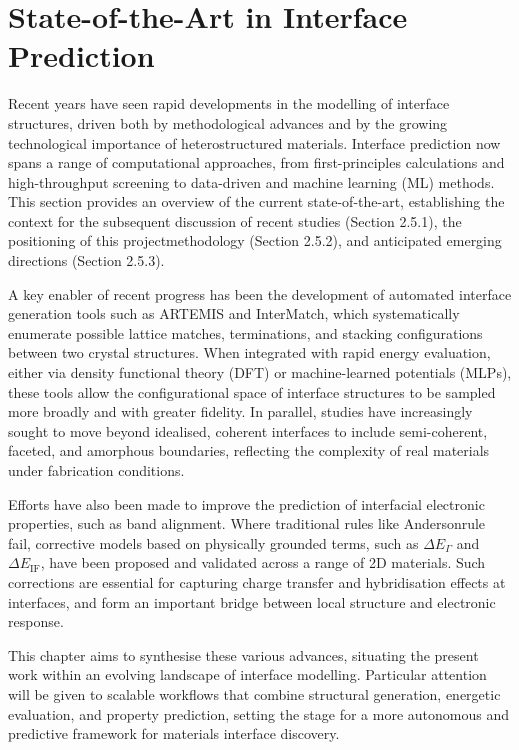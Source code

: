 \section{State-of-the-Art in Interface Prediction} \label{section:state_of_the_art}

Recent years have seen rapid developments in the modelling of interface structures, driven both by methodological advances and by the growing technological importance of heterostructured materials. Interface prediction now spans a range of computational approaches, from first-principles calculations and high-throughput screening to data-driven and machine learning (ML) methods. This section provides an overview of the current state-of-the-art, establishing the context for the subsequent discussion of recent studies (Section 2.5.1), the positioning of this project\rqss methodology (Section 2.5.2), and anticipated emerging directions (Section 2.5.3).

A key enabler of recent progress has been the development of automated interface generation tools such as ARTEMIS and InterMatch, which systematically enumerate possible lattice matches, terminations, and stacking configurations between two crystal structures. When integrated with rapid energy evaluation, either via density functional theory (DFT) or machine-learned potentials (MLPs), these tools allow the configurational space of interface structures to be sampled more broadly and with greater fidelity. In parallel, studies have increasingly sought to move beyond idealised, coherent interfaces to include semi-coherent, faceted, and amorphous boundaries, reflecting the complexity of real materials under fabrication conditions.

Efforts have also been made to improve the prediction of interfacial electronic properties, such as band alignment. Where traditional rules like Anderson\rqss rule fail, corrective models based on physically grounded terms, such as $\Delta E_{\Gamma}$ and $\Delta E_{\mathrm{IF}}$, have been proposed and validated across a range of 2D materials. Such corrections are essential for capturing charge transfer and hybridisation effects at interfaces, and form an important bridge between local structure and electronic response.

This chapter aims to synthesise these various advances, situating the present work within an evolving landscape of interface modelling. Particular attention will be given to scalable workflows that combine structural generation, energetic evaluation, and property prediction, setting the stage for a more autonomous and predictive framework for materials interface discovery.

